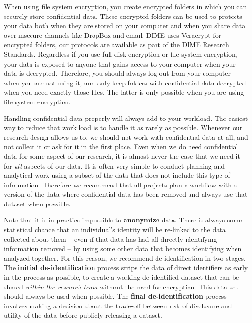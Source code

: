 When using file system encryption, you create encrypted folders 
in which you can securely store confidential data.
These encrypted folders can be used to protects your data 
both when they are stored on your computer 
and when you share data over insecure channels like DropBox and email.
DIME uses Veracrypt for encrypted folders,
our protocols are available as part of the DIME Research Standards.
Regardless if you use full disk encryption or file system encryption,
your data is exposed to anyone that gains access to your computer 
when your data is decrypted. 
Therefore, you should always log out from your computer when you are not using it,
and only keep folders with confidential data decrypted when you need exactly those files.
The latter is only possible when you are using file system encryption.

Handling confidential data properly will always add to your workload.
The easiest way to reduce that work load is to
handle it as rarely as possible.
Whenever our research design allows us to,
we should not work with confidential data at all,
and not collect it or ask for it in the first place.
Even when we do need confidential data for some aspect of our research,
it is almost never the case that we need it for \textit{all} aspects of our data.
It is often very simple to conduct planning and analytical work
using a subset of the data that does not include this type of information.
Therefore we recommend that all projects plan a workflow
with a version of the data where confidential data has been removed
and always use that dataset when possible.

Note that it is in practice impossible
to \textbf{anonymize} data.
There is always some statistical chance that an individual's identity
will be re-linked to the data collected about them
-- even if that data has had all directly identifying information removed --
by using some other data that becomes identifying when analyzed together.
For this reason, we recommend de-identification in two stages.
The \textbf{initial de-identification} process strips the data of direct identifiers
as early in the process as possible,
to create a working de-identified dataset that
can be shared \textit{within the research team} without the need for encryption.
This data set should always be used when possible.
The \textbf{final de-identification} process involves
making a decision about the trade-off between
risk of disclosure and utility of the data
before publicly releasing a dataset.

